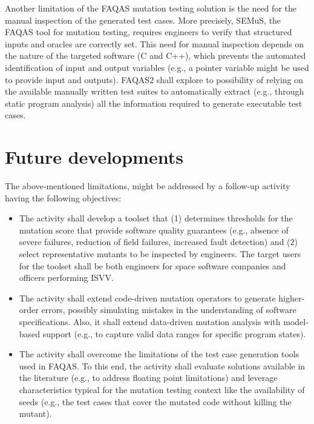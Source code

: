 Another limitation of the FAQAS mutation testing solution is the need for the manual inspection of the generated test cases. More precisely, SEMuS, the FAQAS tool for mutation testing, requires engineers to verify that structured inputs and oracles are correctly set. This need for manual inspection depends on the nature of the targeted software (C and C++), which prevents the automated identification of input and output variables (e.g., a pointer variable might be used to provide input and outputs). FAQAS2 shall explore to possibility of relying on the available manually written test suites to automatically extract (e.g., through static program analysis) all the information required to generate executable test cases.

\section*{Future developments}

The above-mentioned limitations, might be addressed by a follow-up activity having the following objectives:

\begin{itemize} 
\item {}
The activity shall develop a toolset that (1) determines thresholds for the mutation score that provide software quality guarantees (e.g., absence of severe failures, reduction of field failures, increased fault detection) and (2) select representative mutants to be inspected by engineers. The target users for the toolset shall be both engineers for space software companies and officers performing ISVV.

\item {} The activity shall extend code-driven mutation operators to generate higher-order errors, possibly simulating mistakes in the understanding of software specifications. Also, it shall extend data-driven mutation analysis with model-based support (e.g., to capture valid data ranges for specific program states).

\item {} The activity shall overcome the limitations of the test case generation tools used in FAQAS. To this end, the activity shall evaluate solutions available in the literature (e.g., to address floating point limitations) and leverage characteristics typical for the mutation testing context like the availability of seeds (e.g., the test cases that cover the mutated code without killing the mutant).

\end{itemize} 

